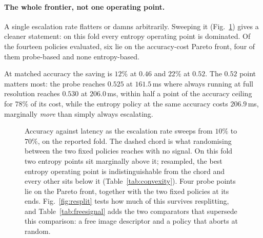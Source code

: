 \documentclass[10pt,twocolumn]{article}
\theoremstyle{plain}
\begin{document}
\paragraph{The whole frontier, not one operating point.} A single escalation
rate flatters or damns arbitrarily. Sweeping it (Fig.~\ref{fig:frontier}) gives
a cleaner statement: on this fold every entropy operating point is dominated.
Of the fourteen policies evaluated, six lie on the accuracy-cost Pareto front,
four of them probe-based and none entropy-based.

At matched accuracy the saving is $12\%$ at $0.46$ and $22\%$ at $0.52$. The
$0.52$ point matters most: the probe reaches $0.525$ at $161.5$\,ms where always
running at full resolution reaches $0.530$ at $206.0$\,ms, within half a point of the accuracy ceiling for $78\%$ of its cost, while the entropy policy at the
same accuracy costs $206.9$\,ms, marginally \emph{more} than simply always
escalating.

\begin{figure}[t]
\centering
{}
\caption{Accuracy against latency as the escalation rate sweeps from $10\%$ to
$70\%$, on the reported fold. The dashed chord is what randomising between the
two fixed policies reaches with no signal. On this fold two entropy points sit
marginally above it; resampled, the best entropy operating point is
indistinguishable from the chord and every other sits below it
(Table~\ref{tab:convexity}). Four probe points lie on the Pareto front,
together with the two fixed policies at its ends. Fig.~\ref{fig:resplit} tests
how much of this survives resplitting, and Table~\ref{tab:freesignal} adds the
two comparators that supersede this comparison: a free image descriptor and a
policy that aborts at random.}
\label{fig:frontier}
\end{figure}
\end{document}
